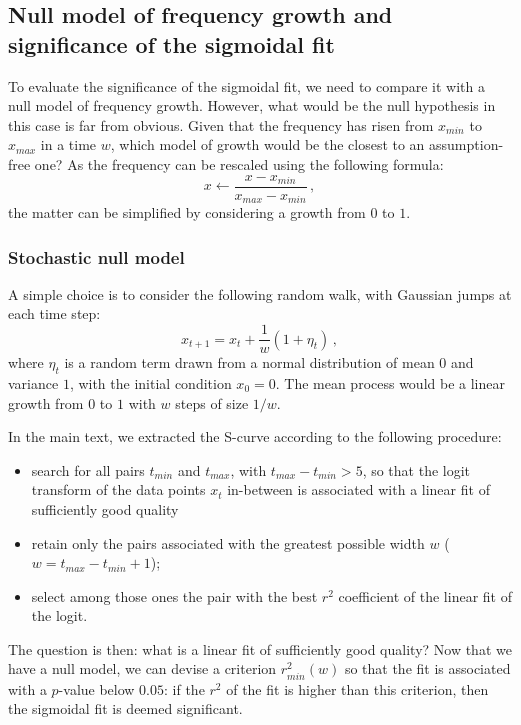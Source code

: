\documentclass[12pt,twocolumn,amsmath,amssymb,aps,longbibliography]{revtex4-1}  %
\begin{document}
\subsection{Null model of frequency growth and significance of the sigmoidal fit \label{pvalue}}

To evaluate the significance of the sigmoidal fit, we need to compare it with a null model of frequency growth. However, what would be the null hypothesis in this case is far from obvious. Given that the frequency has risen from $x_{min}$ to $x_{max}$ in a time $w$, which model of growth would be the closest to an assumption-free one? As the frequency can be rescaled using the following formula:
\begin{equation}
x \leftarrow \frac{x - x_{min}}{x_{max} - x_{min}} \, ,
\end{equation}
the matter can be simplified by considering a growth from $0$ to $1$. 

\subsubsection{Stochastic null model}

A simple choice is to consider the following random walk, with Gaussian jumps at each time step:
\begin{equation}
x_{t+1} = x_t + \frac{1}{w} (1 + \eta_t) \, ,
\end{equation}
where $\eta_t$ is a random term drawn from a normal distribution of mean $0$ and variance $1$, with the initial condition $x_0 = 0$. The mean process would be a linear growth from $0$ to $1$ with $w$ steps of size $1/w$. 

In the main text, we extracted the S-curve according to the following procedure:
\begin{itemize}
\item search for all pairs $t_{min}$ and $t_{max}$, with $t_{max} - t_{min} > 5$, so that the logit transform of the data points $x_t$ in-between is associated with a linear fit of sufficiently good quality
\item retain only the pairs associated with the greatest possible width $w$ ($w = t_{max} - t_{min} +1$);
\item select among those ones the pair with the best $r^2$ coefficient of the linear fit of the logit.
\end{itemize}
The question is then: what is a linear fit of sufficiently good quality? Now that we have a null model, we can devise a criterion $r^2_{min}(w)$ so that the fit is associated with a $p$-value below $0.05$: if the $r^2$ of the fit is higher than this criterion, then the sigmoidal fit is deemed significant. 
\end{document}
